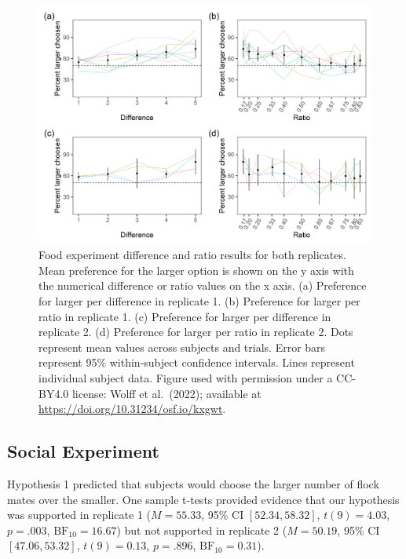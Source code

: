 \documentclass[
  ,doc,floatsintext]{apa6}
\begin{document}
\begin{figure}

{\centering \includegraphics[width=1\linewidth]{../figures/food_figure} 

}

\caption{Food experiment difference and ratio results for both replicates. Mean preference for the larger option is shown on the y axis with the numerical difference or ratio values on the x axis. (a) Preference for larger per difference in replicate 1. (b) Preference for larger per ratio in replicate 1. (c) Preference for larger per difference in replicate 2. (d) Preference for larger per ratio in replicate 2. Dots represent mean values across subjects and trials. Error bars represent 95\% within-subject confidence intervals. Lines represent individual subject data. Figure used with permission under a CC-BY4.0 license: Wolff et al.~(2022); available at \url{https://doi.org/10.31234/osf.io/kxgwt}.}\label{fig:foodgraphs}
\end{figure}

\hypertarget{social-experiment-1}{%
\subsection{Social Experiment}\label{social-experiment-1}}

Hypothesis 1 predicted that subjects would choose the larger number of flock mates over the smaller. One sample t-tests provided evidence that our hypothesis was supported in replicate 1 (\(M = 55.33\), 95\% CI \([52.34, 58.32]\), \(t(9) = 4.03\), \(p = .003\), \(\mathrm{BF}_{\textrm{10}} = 16.67\)) but not supported in replicate 2 (\(M = 50.19\), 95\% CI \([47.06, 53.32]\), \(t(9) = 0.13\), \(p = .896\), \(\mathrm{BF}_{\textrm{10}} = 0.31\)).
\end{document}
